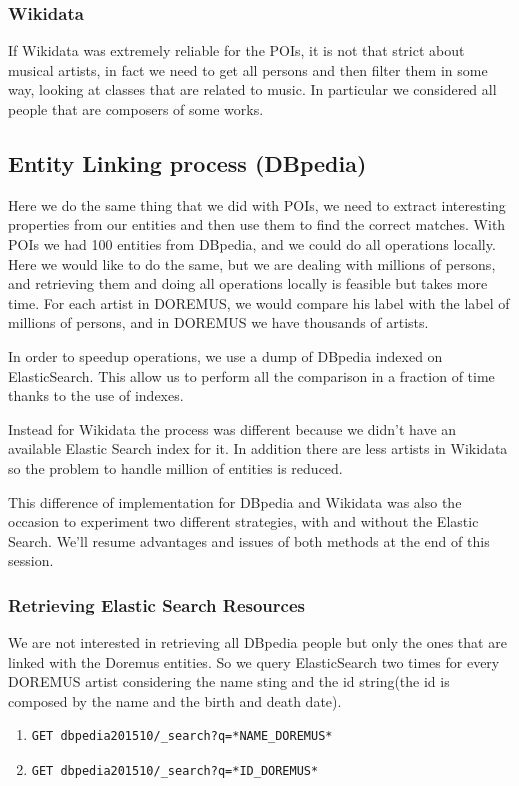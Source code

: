 \documentclass[paper=a4, fontsize=11pt]{scrartcl}
\begin{document}
\subsubsection{Wikidata}
If Wikidata was extremely reliable for the POIs, it is not that strict about musical artists, in fact we need to get all persons and then filter them in some way, looking at classes that are related to music. In particular we considered all people that are composers of some works.

\subsection{Entity Linking process (DBpedia)}
Here we do the same thing that we did with POIs, we need to extract interesting properties from our entities and then use them to find the correct matches.
With POIs we had 100 entities from DBpedia, and we could do all operations locally. Here we would like to do the same, but we are dealing with millions of persons, and retrieving them and doing all operations locally is feasible but takes more time. For each artist in DOREMUS, we would compare his label with the label of millions of persons, and in DOREMUS we have thousands of artists.

In order to speedup operations, we use a dump of DBpedia indexed on ElasticSearch. This allow us to perform all the comparison in a fraction of time thanks to the use of indexes.

Instead for Wikidata the process was different because we didn't have an available Elastic Search index for it. In addition there are less artists in Wikidata so the problem to handle million of entities is reduced.

This difference of implementation for DBpedia and Wikidata was also the occasion to experiment two different strategies, with and without the Elastic Search. We'll resume advantages and issues of both methods at the end of this session.

\subsubsection{Retrieving Elastic Search Resources}
We are not interested in retrieving all DBpedia people but only the ones that are linked with the Doremus entities. So we query ElasticSearch two times for every DOREMUS artist considering the name sting and the id string(the id is composed by the name and the birth and death date).

\begin{enumerate}

\item \begin{verbatim}GET dbpedia201510/_search?q=*NAME_DOREMUS*\end{verbatim}
\item \begin{verbatim}GET dbpedia201510/_search?q=*ID_DOREMUS*\end{verbatim}

\end{enumerate}
\end{document}
